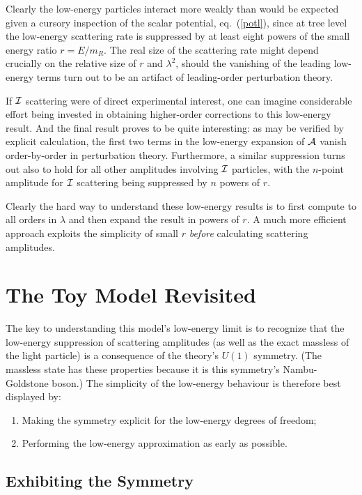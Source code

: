 \documentclass[12pt]{article}
\def\sst{\scriptscriptstyle}
\def\pref#1{(\ref{#1})}
\begin{document}
Clearly the low-energy particles interact more weakly than
would be expected given a cursory inspection of the scalar
potential, eq.~\pref{potl}, since at tree level 
the low-energy scattering rate is suppressed by 
at least eight powers of the small energy ratio $r = E/m_{\sst R}$. 
The real size of the scattering rate might depend crucially
on the relative size of $r$ and $\lambda^2$, should the vanishing
of the leading low-energy terms turn out to be an artifact
of leading-order perturbation theory. 

If ${\cal I}$ scattering were of direct experimental interest, 
one can imagine considerable effort being invested in obtaining
higher-order corrections to this low-energy result. And the
final result proves to be quite interesting: as may be verified by 
explicit calculation, the first two terms in the low-energy
expansion of ${\cal A}$ vanish order-by-order in perturbation theory. 
Furthermore, a similar suppression turns out also to hold 
for all other amplitudes involving ${\cal I}$ particles, with
the $n$-point amplitude for ${\cal I}$ scattering being
suppressed by $n$ powers of $r$. 

Clearly the hard way to understand these low-energy
results is to first compute to all orders in $\lambda$ and 
then expand the result in powers of $r$. A much more
efficient approach exploits the simplicity of small $r$
{\sl before} calculating scattering amplitudes. 

\section{The Toy Model Revisited}

The key to understanding this model's low-energy limit
is to recognize that the low-energy suppression of
scattering amplitudes (as well as the exact massless of
the light particle) is a consequence of the theory's
$U(1)$ symmetry. (The massless state has these
properties because it is this symmetry's
Nambu-Goldstone boson.\cite{ChiPT,GBreviews}) 
The simplicity of the low-energy
behaviour is therefore best displayed by:

\begin{enumerate}
\item
Making the symmetry explicit for the low-energy
degrees of freedom;
%
\item
Performing the low-energy approximation as early as
possible.
%
\end{enumerate}

\subsection{Exhibiting the Symmetry}
\end{document}
